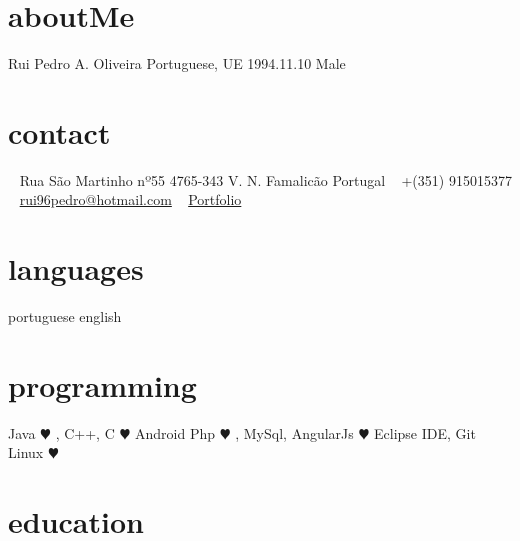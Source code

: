 \documentclass[]{friggeri-cv} %
\begin{document}


\begin{aside} %
\section{aboutMe}
Rui Pedro A. Oliveira
Portuguese, UE
1994.11.10
Male

\section{contact}

~
Rua São Martinho nº55
4765-343 V. N. Famalicão
Portugal
~
+(351) 915015377
~
\href{mailto:rui96pedro@hotmail.com}{rui96pedro@hotmail.com}
~
\href{https://bitbucket.org/ruioliveiras}{Portfolio}
~
\section{languages}
portuguese
english 
\section{programming}
Java {\color{red} $\varheartsuit$} , C++, C {\color{red} $\varheartsuit$}
Android
Php {\color{red} $\varheartsuit$} , MySql, AngularJs {\color{red} $\varheartsuit$} 
Eclipse IDE, Git
Linux {\color{red} $\varheartsuit$} 
~
\end{aside}

\section{education}
\end{document}
